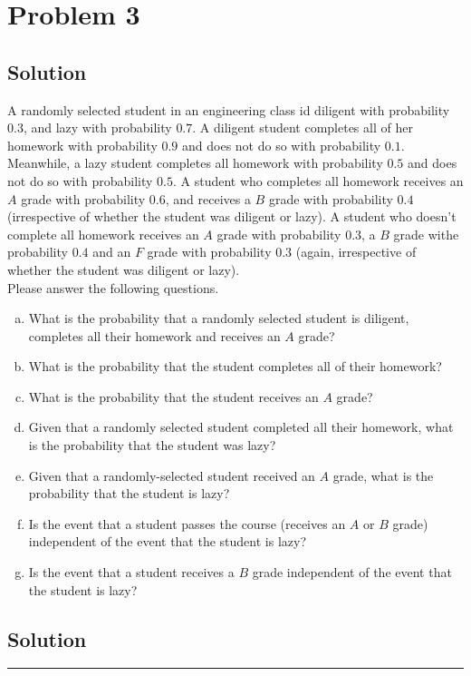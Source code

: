 \section{Problem 3}

\subsection{Solution}
A randomly selected student in an engineering class id diligent with probability $0.3$, and lazy with probability $0.7$. A diligent student completes all of her homework with probability $0.9$ and does not do so with probability $0.1$. Meanwhile, a lazy student completes all homework with probability $0.5$ and does not do so with probability $0.5$. A student who completes all homework receives an $A$ grade with probability $0.6$, and receives a $B$ grade with probability $0.4$ (irrespective of whether the student was diligent or lazy). A student who doesn't complete all homework receives an $A$ grade with probability $0.3$, a $B$ grade withe probability $0.4$ and an $F$ grade with probability $0.3$ (again, irrespective of whether the student was diligent or lazy).\\
Please answer the following questions.\\

\begin{enumerate}[a.]
	\item What is the probability that a randomly selected student is diligent, completes all their homework and receives an $A$ grade?
	\item What is the probability that the student completes all of their homework?
	\item What is the probability that the student receives an $A$ grade?
	\item Given that a randomly selected student completed all their homework, what is the probability that the student was lazy?
	\item Given that a randomly-selected student received an $A$ grade, what is the probability that the student is lazy?
	\item Is the event that a student passes the course (receives an $A$ or $B$ grade) independent of the event that the student is lazy?
	\item Is the event that a student receives a $B$ grade independent of the event that the student is lazy? 
\end{enumerate}

\subsection{Solution}
\noindent\rule{\textwidth}{1pt}